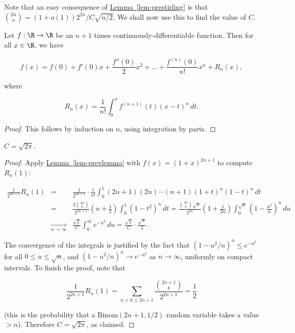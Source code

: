 \noindent Note that an easy consequence of \texorpdfstring{\hyperref[lem-prestirling]{Lemma~\ref*{lem-prestirling}}}{Lemma} is that
$\binom{2n}{n} = (1+o(1))2^{2n}/C\sqrt{n/2}$. We
shall now use this to find the value of $C$.

\begin{lem}
\label{lem-prevlemma}
Let $f:\R\to\R$ be an $n+1$ times
continuously-differentiable function. Then for all
$x\in\R$, we have

\[
f(x) = f(0) + f'(0)x + \frac{f''(0)}{2}x^2 + \ldots + \frac{f^{(n)}(0)}{n!} x^n + R_n(x),
\]

\noindent where

\[
R_n(x) = \frac{1}{n!} \int_0^x f^{(n+1)}(t)(x-t)^n\,dt.
\]

\end{lem}

\begin{proof}
This follows by induction on $n$, using integration
by parts.
\end{proof}

\begin{lem}
$C=\sqrt{2\pi}$.
\end{lem}

\begin{proof}
Apply \hyperref[lem-prevlemma]{Lemma~\ref*{lem-prevlemma}} with $f(x) = (1+x)^{2n+1}$
to compute $R_n(1)$:

\begin{eqnarray*}
\frac{1}{2^{2n+1}} R_n(1) &=& \frac{1}{2^{2n+1}} \cdot \frac{1}{n!}\int_0^1 (2n+1)(2n)\cdots (n+1)(1+t)^n (1-t)^n
\,dt \\ &=& \frac{2 \binom{2n}{n}}{2^{2n+1}} (n+\frac12) \int_0^1 (1-t^2)^n\, dt = \frac{ \binom{2n}{n} \sqrt{n}}{2^{2n}}
(1+\frac{1}{2n}) \int_0^{\sqrt{n}} \left(1-\frac{u^2}{n}\right)^n\,du \\
&\xrightarrow[n\to\infty]{} & \frac{\sqrt{2}}{C} \int_0^\infty e^{-u^2}\,du = \frac{\sqrt{2}}{C} \cdot \frac{\sqrt{\pi}}{2}.
\end{eqnarray*}

\noindent The convergence of the integrals is justified by the
fact that $(1-u^2/n)^n \le e^{-u^2}$ for all
$0\le u\le \sqrt{n}$, and $(1-u^2/n)^n \to e^{-u^2}$
as $n\to\infty$, uniformly on compact intervals. To
finish the proof, note that

\[
\frac{1}{2^{2n+1}} R_n(1) = \sum_{n<k\le 2n+1} \frac{\binom{2n+1}{k}}{2^{2n+1}} = \frac12
\]

\noindent (this is the probability that a
$\textrm{Binom}(2n+1,1/2)$ random variable takes a
value $> n$). Therefore $C=\sqrt{2\pi}$, as claimed.
\end{proof}

